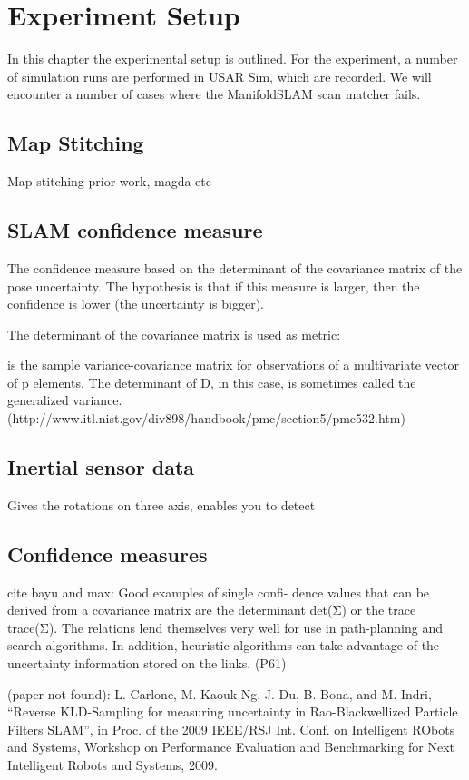 \chapter{Experiment Setup}
In this chapter the experimental setup is outlined. For the experiment, a number of simulation runs are performed in USAR Sim, which are recorded. We will encounter a number of cases where the ManifoldSLAM scan matcher fails. 

\section{Map Stitching}
Map stitching prior work, magda etc

\section{SLAM confidence measure}
The confidence measure based on the determinant of the covariance matrix of the pose uncertainty. The hypothesis is that if this measure is larger, then the confidence is lower (the uncertainty is bigger).

The determinant of the covariance matrix is used as metric:

is the sample variance-covariance matrix for observations of a multivariate vector of p elements. The determinant of D, in this case, is sometimes called the generalized variance. (http://www.itl.nist.gov/div898/handbook/pmc/section5/pmc532.htm)

\section{Inertial sensor data}
Gives the rotations on three axis, enables you to detect 

\section{Confidence measures}
cite bayu and max:     Good examples of single confi- dence values that can be derived from a covariance matrix are the determinant det(Σ) or the trace trace(Σ). The relations lend themselves very well for use in path-planning and search algorithms. In addition, heuristic algorithms can take advantage of the uncertainty information stored on the links. (P61)


(paper not found): L. Carlone, M. Kaouk Ng, J. Du, B. Bona, and M. Indri, “Reverse KLD-Sampling for measuring uncertainty in Rao-Blackwellized Particle Filters SLAM”, in Proc. of the 2009 IEEE/RSJ Int. Conf. on Intelligent RObots and Systems, Workshop on Performance Evaluation and Benchmarking for Next Intelligent Robots and Systems, 2009.

